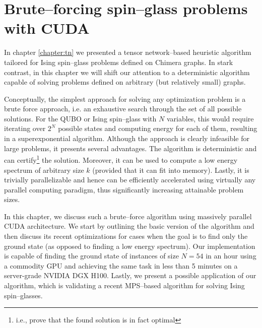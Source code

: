 \chapter[Brute--forcing spin--glass problems]{Brute--forcing spin--glass problems with CUDA}
\label{chapter:bruteforce}
In chapter \ref{chapter:tn} we presented a tensor network--based heuristic algorithm
tailored for Ising spin--glass problems defined on Chimera graphs. In stark contrast, in this
chapter we will shift our attention to a deterministic algorithm capable of solving problems defined
on arbitrary (but relatively small) graphs.

Conceptually, the simplest approach for solving any optimization problem is a
brute force approach, i.e. an exhaustive search through the set of all possible
solutions. For the QUBO or Ising spin--glass with $N$ variables, this would
require iterating over $2^{N}$ possible states and computing energy for each of
them, resulting in a superexponential algorithm. Although the approach is
clearly infeasible for large problems, it presents several advantages. The
algorithm is deterministic and can certify\footnote{i.e., prove that the found
  solution is in fact optimal} the solution. Moreover, it can be used to compute
a low energy spectrum of arbitrary size $k$ (provided that it can fit into
memory). Lastly, it is trivially parallelizable and hence can be efficiently
accelerated using virtually any parallel computing paradigm, thus significantly
increasing attainable problem sizes.

In this chapter, we discuss such a brute--force algorithm using massively
parallel CUDA architecture. We start by outlining the basic version of the
algorithm and then discuss its recent optimizations for cases when the goal is
to find only the ground state (as opposed to finding a low energy spectrum).
Our implementation is capable of finding the ground state of instances of size
$N=54$ in an hour using a commodity GPU and achieving the same task in less
than 5 minutes on a server-grade NVIDIA DGX H100. Lastly, we present a possible
application of our algorithm, which is validating a recent MPS--based algorithm
for solving Ising spin--glasses.


